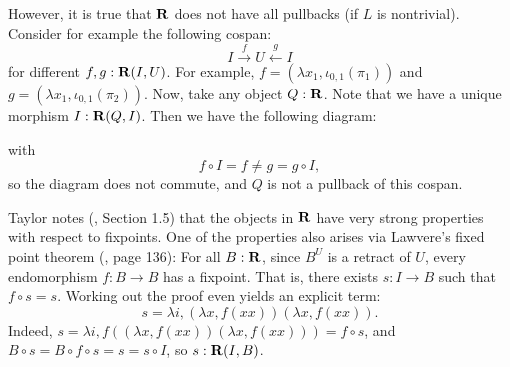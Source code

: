 However, it is true that $ \mathbf{R} $ does not have all pullbacks (if $ L $ is nontrivial). Consider for example the following cospan:
\[ I \xrightarrow f U \xleftarrow g I \]
for different $ f, g: \mathbf{R}(I, U) $. For example, $ f = (\lambda x_1, \iota_{0, 1}(\pi_1)) $ and $ g = (\lambda x_1, \iota_{0, 1}(\pi_2)) $. Now, take any object $ Q: \mathbf{R} $. Note that we have a unique morphism $ I: \mathbf{R}(Q, I) $. Then we have the following diagram:
\begin{center}
\end{center}
with
\[ f \circ I = f \not = g = g \circ I, \]
so the diagram does not commute, and $ Q $ is not a pullback of this cospan.

Taylor notes (\cite{taylor}, Section 1.5) that the objects in $ \mathbf{R} $ have very strong properties with respect to fixpoints. One of the properties also arises via Lawvere's fixed point theorem (\cite{lawvere-fixpoints}, page 136): For all $ B: \mathbf{R} $, since $ B^U $ is a retract of $ U $, every endomorphism $ f: B \to B $ has a fixpoint. That is, there exists $ s: I \to B $ such that $ f \circ s = s $. Working out the proof even yields an explicit term:
\[ s = \lambda i, (\lambda x, f (x x)) (\lambda x, f (x x)). \]
Indeed, $ s = \lambda i, f ((\lambda x, f (x x)) (\lambda x, f (x x))) = f \circ s $, and $ B \circ s = B \circ f \circ s = s = s \circ I $, so $ s : \mathbf{R}(I, B) $.

